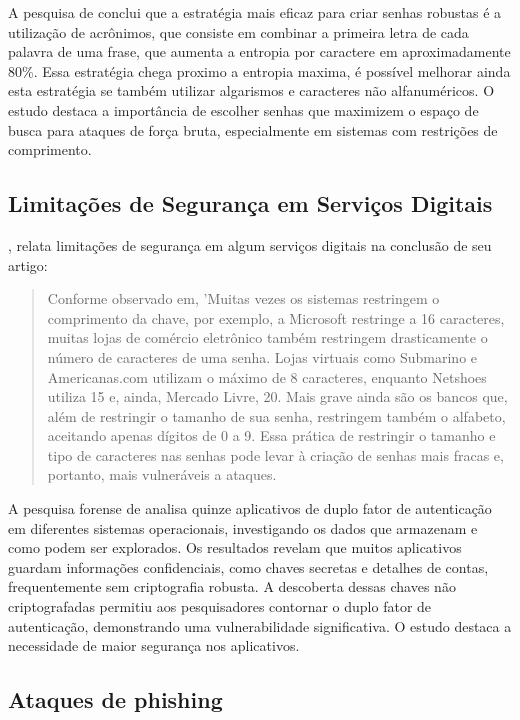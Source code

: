 \documentclass[12pt]{article}
\begin{document}
A pesquisa de \cite{article:1} conclui que a estratégia mais eficaz para criar senhas
robustas é a utilização de acrônimos, que consiste em combinar a primeira letra de
cada palavra de uma frase, que aumenta a entropia por caractere em aproximadamente 80\%.
Essa estratégia chega proximo a entropia maxima, é possível melhorar ainda esta
estratégia se também utilizar algarismos e caracteres não alfanuméricos.
O estudo destaca a importância de escolher senhas que maximizem o espaço
de busca para ataques de força bruta, especialmente em sistemas com
restrições de comprimento.

\subsection{Limitações de Segurança em Serviços Digitais}

\cite{article:1}, relata limitações de segurança em algum serviços
digitais na conclusão de seu artigo:
\begin{quote}
  Conforme observado em, 'Muitas vezes os sistemas restringem o comprimento da chave, por exemplo, a
  Microsoft restringe a 16 caracteres, muitas lojas de comércio eletrônico também restringem drasticamente o
  número de caracteres de uma senha. Lojas virtuais como Submarino e Americanas.com utilizam o máximo de 8
  caracteres, enquanto Netshoes utiliza 15 e, ainda, Mercado Livre, 20. Mais grave ainda são os bancos que,
  além de restringir o tamanho de sua senha, restringem também o alfabeto, aceitando apenas dígitos de 0 a 9.
  Essa prática de restringir o tamanho e tipo de caracteres nas senhas pode levar à criação de senhas mais
  fracas e, portanto, mais vulneráveis a ataques. \cite{article:1}
\end{quote}

A pesquisa forense de \cite{article:2} analisa quinze aplicativos de duplo fator de
autenticação em diferentes sistemas operacionais, investigando os dados que armazenam
e como podem ser explorados.
Os resultados revelam que muitos aplicativos guardam informações confidenciais, como
chaves secretas e detalhes de contas, frequentemente sem criptografia robusta.
A descoberta dessas chaves não criptografadas permitiu aos pesquisadores contornar o 
duplo fator de autenticação, demonstrando uma vulnerabilidade significativa.
O estudo destaca a necessidade de maior segurança nos aplicativos.

\subsection{Ataques de phishing}
\end{document}
